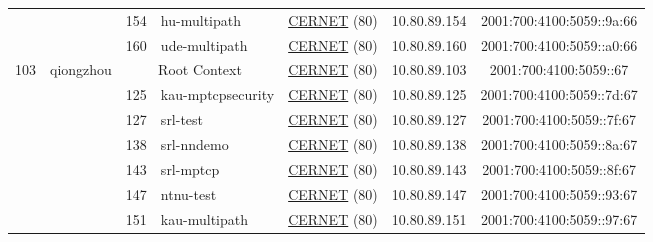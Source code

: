 \begin{small}
\begin{center}
\begin{longtable}{|c|c|c|c|c|c|c|c|}
  &  & \tiny{154} & \multicolumn{1}{|l|}{\tiny{hu-multipath}} & \multicolumn{2}{|c|}{\tiny{\href{http://www.cernet.edu.cn}{CERNET} (80)}} & \tiny{10.80.89.154} & \tiny{2001:700:4100:5059::9a:66} \\* \cline{3-3}\cline{4-4}\cline{5-5}\cline{6-6}\cline{7-7}\cline{8-8}
  &  & \tiny{160} & \multicolumn{1}{|l|}{\tiny{ude-multipath}} & \multicolumn{2}{|c|}{\tiny{\href{http://www.cernet.edu.cn}{CERNET} (80)}} & \tiny{10.80.89.160} & \tiny{2001:700:4100:5059::a0:66} \\ \hline
 \multirow{10}{*}{\tiny{103}} & \multicolumn{1}{|l|}{\multirow{10}{*}{\tiny{qiongzhou}}} & \multicolumn{2}{|c|}{\tiny{Root Context}} & \multicolumn{2}{|c|}{\tiny{\href{http://www.cernet.edu.cn}{CERNET} (80)}} & \tiny{10.80.89.103} & \tiny{2001:700:4100:5059::67} \\* \cline{3-3}\cline{4-4}\cline{5-5}\cline{6-6}\cline{7-7}\cline{8-8}
  &  & \tiny{125} & \multicolumn{1}{|l|}{\tiny{kau-mptcpsecurity}} & \multicolumn{2}{|c|}{\tiny{\href{http://www.cernet.edu.cn}{CERNET} (80)}} & \tiny{10.80.89.125} & \tiny{2001:700:4100:5059::7d:67} \\* \cline{3-3}\cline{4-4}\cline{5-5}\cline{6-6}\cline{7-7}\cline{8-8}
  &  & \tiny{127} & \multicolumn{1}{|l|}{\tiny{srl-test}} & \multicolumn{2}{|c|}{\tiny{\href{http://www.cernet.edu.cn}{CERNET} (80)}} & \tiny{10.80.89.127} & \tiny{2001:700:4100:5059::7f:67} \\* \cline{3-3}\cline{4-4}\cline{5-5}\cline{6-6}\cline{7-7}\cline{8-8}
  &  & \tiny{138} & \multicolumn{1}{|l|}{\tiny{srl-nndemo}} & \multicolumn{2}{|c|}{\tiny{\href{http://www.cernet.edu.cn}{CERNET} (80)}} & \tiny{10.80.89.138} & \tiny{2001:700:4100:5059::8a:67} \\* \cline{3-3}\cline{4-4}\cline{5-5}\cline{6-6}\cline{7-7}\cline{8-8}
  &  & \tiny{143} & \multicolumn{1}{|l|}{\tiny{srl-mptcp}} & \multicolumn{2}{|c|}{\tiny{\href{http://www.cernet.edu.cn}{CERNET} (80)}} & \tiny{10.80.89.143} & \tiny{2001:700:4100:5059::8f:67} \\* \cline{3-3}\cline{4-4}\cline{5-5}\cline{6-6}\cline{7-7}\cline{8-8}
  &  & \tiny{147} & \multicolumn{1}{|l|}{\tiny{ntnu-test}} & \multicolumn{2}{|c|}{\tiny{\href{http://www.cernet.edu.cn}{CERNET} (80)}} & \tiny{10.80.89.147} & \tiny{2001:700:4100:5059::93:67} \\* \cline{3-3}\cline{4-4}\cline{5-5}\cline{6-6}\cline{7-7}\cline{8-8}
  &  & \tiny{151} & \multicolumn{1}{|l|}{\tiny{kau-multipath}} & \multicolumn{2}{|c|}{\tiny{\href{http://www.cernet.edu.cn}{CERNET} (80)}} & \tiny{10.80.89.151} & \tiny{2001:700:4100:5059::97:67} \\* \cline{3-3}\cline{4-4}\cline{5-5}\cline{6-6}\cline{7-7}\cline{8-8}

\end{longtable}
\end{center}
\end{small}
